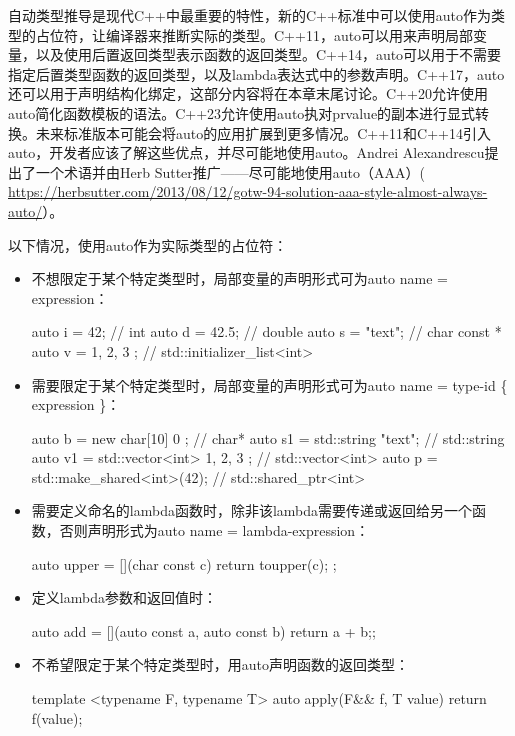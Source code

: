 
自动类型推导是现代C++中最重要的特性，新的C++标准中可以使用auto作为类型的占位符，让编译器来推断实际的类型。C++11，auto可以用来声明局部变量，以及使用后置返回类型表示函数的返回类型。C++14，auto可以用于不需要指定后置类型函数的返回类型，以及lambda表达式中的参数声明。C++17，auto还可以用于声明结构化绑定，这部分内容将在本章末尾讨论。C++20允许使用auto简化函数模板的语法。C++23允许使用auto执对prvalue的副本进行显式转换。未来标准版本可能会将auto的应用扩展到更多情况。C++11和C++14引入auto，开发者应该了解这些优点，并尽可能地使用auto。Andrei Alexandrescu提出了一个术语并由Herb Sutter推广——尽可能地使用auto（AAA）(\url{ https://herbsutter.com/2013/08/12/gotw-94-solution-aaa-style-almost-always-auto/}）。


以下情况，使用auto作为实际类型的占位符：

\begin{itemize}
\item
不想限定于某个特定类型时，局部变量的声明形式可为auto name = expression：

\begin{cpp}
auto i = 42;          // int
auto d = 42.5;        // double
auto s = "text";      // char const *
auto v = { 1, 2, 3 }; // std::initializer_list<int>
\end{cpp}

\item
需要限定于某个特定类型时，局部变量的声明形式可为auto name = type-id \{ expression \}：

\begin{cpp}
auto b  = new char[10]{ 0 };            // char*
auto s1 = std::string {"text"};         // std::string
auto v1 = std::vector<int> { 1, 2, 3 }; // std::vector<int>
auto p  = std::make_shared<int>(42);    // std::shared_ptr<int>
\end{cpp}

\item
需要定义命名的lambda函数时，除非该lambda需要传递或返回给另一个函数，否则声明形式为auto name = lambda-expression：

\begin{cpp}
auto upper = [](char const c) {return toupper(c); };
\end{cpp}

\item
定义lambda参数和返回值时：

\begin{cpp}
auto add = [](auto const a, auto const b) {return a + b;};
\end{cpp}

\item
不希望限定于某个特定类型时，用auto声明函数的返回类型：

\begin{cpp}
template <typename F, typename T>
auto apply(F&& f, T value)
{
    return f(value);
}
\end{cpp}
\end{itemize}


